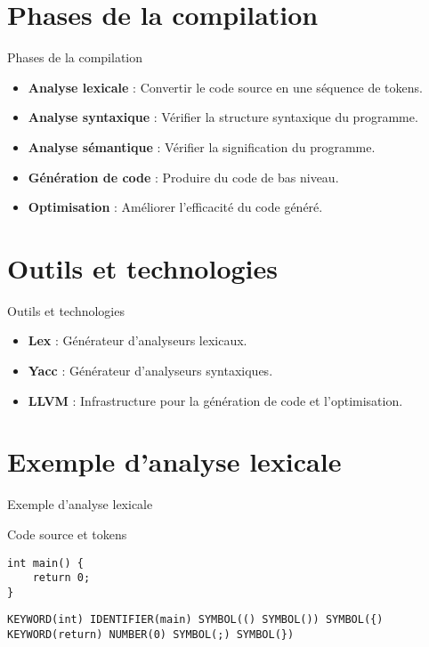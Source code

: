 \documentclass{clbeamer2024}
\begin{document}
	\section{Phases de la compilation}
	\begin{frame}{Phases de la compilation}
		\begin{itemize}
			\item \textbf{Analyse lexicale} : Convertir le code source en une séquence de tokens.
			\item \textbf{Analyse syntaxique} : Vérifier la structure syntaxique du programme.
			\item \textbf{Analyse sémantique} : Vérifier la signification du programme.
			\item \textbf{Génération de code} : Produire du code de bas niveau.
			\item \textbf{Optimisation} : Améliorer l'efficacité du code généré.
		\end{itemize}
	\end{frame}
	
	\section{Outils et technologies}
	\begin{frame}{Outils et technologies}
		\begin{itemize}
			\item \textbf{Lex} : Générateur d'analyseurs lexicaux.
			\item \textbf{Yacc} : Générateur d'analyseurs syntaxiques.
			\item \textbf{LLVM} : Infrastructure pour la génération de code et l'optimisation.
		\end{itemize}
	\end{frame}
	
	
	
	\section{Exemple d'analyse lexicale}
	\begin{frame}[fragile]{Exemple d'analyse lexicale}
		\begin{exampleblock}{Code source et tokens}
			\begin{verbatim}
int main() {
	return 0;
}
	\end{verbatim}
			\begin{verbatim}
KEYWORD(int) IDENTIFIER(main) SYMBOL(() SYMBOL()) SYMBOL({) KEYWORD(return) NUMBER(0) SYMBOL(;) SYMBOL(})
			\end{verbatim}
		\end{exampleblock}
	\end{frame}
	
\end{document}
